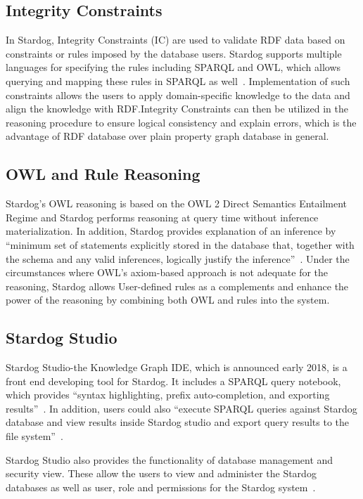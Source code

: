 \subsection{Integrity Constraints}
In Stardog, Integrity Constraints (IC) are used to validate RDF data based on 
constraints or rules imposed by the database users. Stardog supports 
multiple languages for specifying the rules including SPARQL and OWL, 
which allows querying and mapping these rules in SPARQL as 
well~\cite{hid-sp18-405-www-stardog-docs}. Implementation of such 
constraints allows the users to apply domain-specific knowledge to the data 
and align the knowledge with RDF.\@ Integrity Constraints can then be 
utilized in the reasoning procedure to ensure logical consistency and explain 
errors, which is the advantage of RDF database over plain property graph 
database in general. 

\subsection{OWL and Rule Reasoning}
Stardog’s OWL reasoning is based on the OWL 2 Direct Semantics Entailment 
Regime and Stardog performs reasoning at query time without inference 
materialization. In addition, Stardog provides explanation of an inference by 
``minimum set of statements explicitly stored in the database that, together 
with the schema and any valid inferences, logically justify the 
inference''~\cite{hid-sp18-405-www-stardog-docs}. Under the circumstances 
where OWL’s axiom-based approach is not adequate for the reasoning, 
Stardog allows User-defined rules as a complements and enhance the power 
of the reasoning by combining both OWL and rules into the system. 

\subsection{Stardog Studio}
Stardog Studio-the Knowledge Graph IDE, which is announced early 2018, is 
a front end developing tool for Stardog. It includes a SPARQL query 
notebook, which provides ``syntax highlighting, prefix auto-completion, and 
exporting results''~\cite{hid-sp18-405-blog-stardog-studio}. In addition, 
users could also ``execute SPARQL queries against Stardog database and 
view results inside Stardog studio and export query results to the file 
system''~\cite{hid-sp18-405-www-stardog-studio}.

Stardog Studio also provides the functionality of database management and 
security view. These allow the users to view and administer the Stardog 
databases as well as user, role and permissions for the Stardog 
system~\cite{hid-sp18-405-blog-stardog-studio}.

